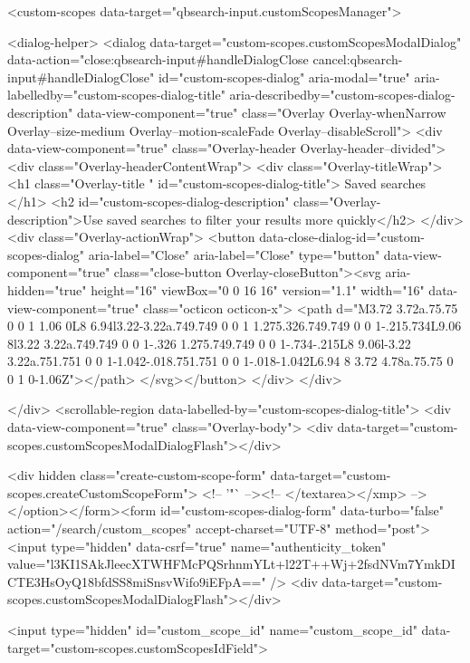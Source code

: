     <custom-scopes data-target="qbsearch-input.customScopesManager">
    
<dialog-helper>
  <dialog data-target="custom-scopes.customScopesModalDialog" data-action="close:qbsearch-input#handleDialogClose cancel:qbsearch-input#handleDialogClose" id="custom-scopes-dialog" aria-modal="true" aria-labelledby="custom-scopes-dialog-title" aria-describedby="custom-scopes-dialog-description" data-view-component="true" class="Overlay Overlay-whenNarrow Overlay--size-medium Overlay--motion-scaleFade Overlay--disableScroll">
    <div data-view-component="true" class="Overlay-header Overlay-header--divided">
  <div class="Overlay-headerContentWrap">
    <div class="Overlay-titleWrap">
      <h1 class="Overlay-title " id="custom-scopes-dialog-title">
        Saved searches
      </h1>
        <h2 id="custom-scopes-dialog-description" class="Overlay-description">Use saved searches to filter your results more quickly</h2>
    </div>
    <div class="Overlay-actionWrap">
      <button data-close-dialog-id="custom-scopes-dialog" aria-label="Close" aria-label="Close" type="button" data-view-component="true" class="close-button Overlay-closeButton"><svg aria-hidden="true" height="16" viewBox="0 0 16 16" version="1.1" width="16" data-view-component="true" class="octicon octicon-x">
    <path d="M3.72 3.72a.75.75 0 0 1 1.06 0L8 6.94l3.22-3.22a.749.749 0 0 1 1.275.326.749.749 0 0 1-.215.734L9.06 8l3.22 3.22a.749.749 0 0 1-.326 1.275.749.749 0 0 1-.734-.215L8 9.06l-3.22 3.22a.751.751 0 0 1-1.042-.018.751.751 0 0 1-.018-1.042L6.94 8 3.72 4.78a.75.75 0 0 1 0-1.06Z"></path>
</svg></button>
    </div>
  </div>
  
</div>
      <scrollable-region data-labelled-by="custom-scopes-dialog-title">
        <div data-view-component="true" class="Overlay-body">        <div data-target="custom-scopes.customScopesModalDialogFlash"></div>

        <div hidden class="create-custom-scope-form" data-target="custom-scopes.createCustomScopeForm">
        <!-- '"` --><!-- </textarea></xmp> --></option></form><form id="custom-scopes-dialog-form" data-turbo="false" action="/search/custom_scopes" accept-charset="UTF-8" method="post"><input type="hidden" data-csrf="true" name="authenticity_token" value="l3KI1SAkJleecXTWHFMcPQSrhnmYLt+l22T++Wj+2fsdNVm7YmkDICTE3HsOyQ18bfdSS8miSnsvWifo9iEFpA==" />
          <div data-target="custom-scopes.customScopesModalDialogFlash"></div>

          <input type="hidden" id="custom_scope_id" name="custom_scope_id" data-target="custom-scopes.customScopesIdField">

